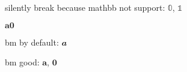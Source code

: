 \documentclass{article}
\begin{document}
silently break because mathbb not support: $𝟘$, $𝟙$

$𝐚 𝟎$

bm by default: $𝒂$

\renewcommand \umiMathbf {\bm}
bm good: $𝐚$, $𝟎$
\end{document}

